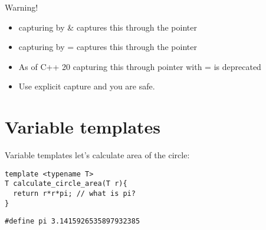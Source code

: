\documentclass[10pt]{beamer}
\begin{document}
\begin{frame}{Warning!}
	\begin{itemize}[<+- |alert@+>]
		\item capturing by \alert{\&} captures \alert{this} through the pointer
		\item capturing by \alert{=} captures \alert{this} through the pointer
		\item As of C++ 20 capturing this through pointer with \alert{=} is deprecated
		\item Use explicit capture and you are safe.
	\end{itemize}
\end{frame}


\section{Variable templates}
\begin{frame}[fragile]{Variable templates}
	\centering let's calculate area of the circle:

	\begin{verbatim}
template <typename T>
T calculate_circle_area(T r){
  return r*r*pi; // what is pi?
}	
	\end{verbatim}

	\pause

	\begin{verbatim}
#define pi 3.1415926535897932385 
	\end{verbatim} 

\end{frame}
\end{document}
